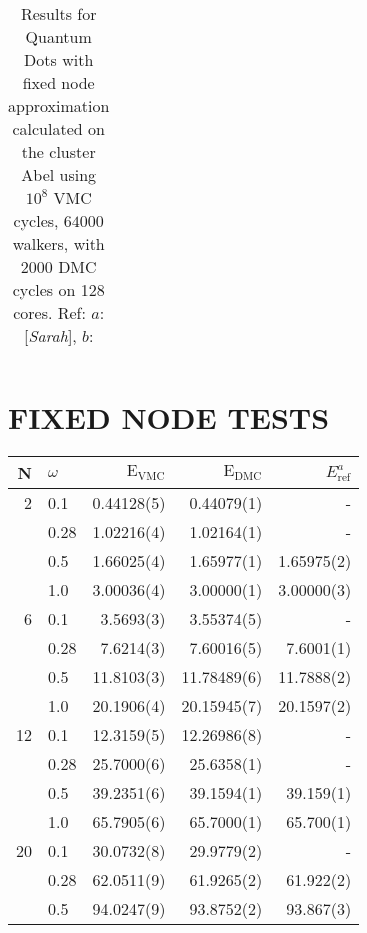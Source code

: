 \begin{table}
\begin{center}
\begin{tabular}{rl|rrrr}
\end{tabular}
\caption{Results for Quantum Dots with fixed node approximation calculated on the cluster Abel using $10^8$ VMC cycles, $64000$ walkers, with $2000$ DMC cycles on 128 cores. Ref: $a$: [\textit{Sarah}], $b$: \cite{MagnusArticle}}
\end{center}
\end{table}



\cite{inf3331}

\section{FIXED NODE TESTS}

\begin{table}
\begin{center}
\begin{tabular}{rl|rrr}
    N     & $\omega$ & $\mathrm{E_{VMC}}$ & $\mathrm{E_{DMC}}$ & $E_\mathrm{ref}^a$\\
\hline\hline
    2     &   0.1    & 0.44128(5) & 0.44079(1)     & - \\
          &   0.28   & 1.02216(4) & 1.02164(1)     & - \\
          &   0.5    & 1.66025(4) & 1.65977(1)     & 1.65975(2) \\
          &   1.0    & 3.00036(4) & 3.00000(1)     & 3.00000(3) \\
\hline        
    6     &   0.1    & 3.5693(3)   & 3.55374(5)    & -\\
          &   0.28   & 7.6214(3)   & 7.60016(5)    & 7.6001(1) \\ 
          &   0.5    & 11.8103(3)  & 11.78489(6)   & 11.7888(2)\\
          &   1.0    & 20.1906(4)  & 20.15945(7)   & 20.1597(2) \\
\hline
    12    &   0.1    & 12.3159(5)  & 12.26986(8)  & -\\
          &   0.28   & 25.7000(6)  & 25.6358(1)   & -\\
          &   0.5    & 39.2351(6)  & 39.1594(1)   & 39.159(1) \\
          &   1.0    & 65.7905(6)  & 65.7000(1)   & 65.700(1)\\
\hline
    20    &   0.1    & 30.0732(8)  & 29.9779(2)  & -\\
          &   0.28   & 62.0511(9)  & 61.9265(2)  & 61.922(2) \\
          &   0.5    & 94.0247(9)  & 93.8752(2)  & 93.867(3) \\

\end{tabular}
\end{center}
\end{table}
